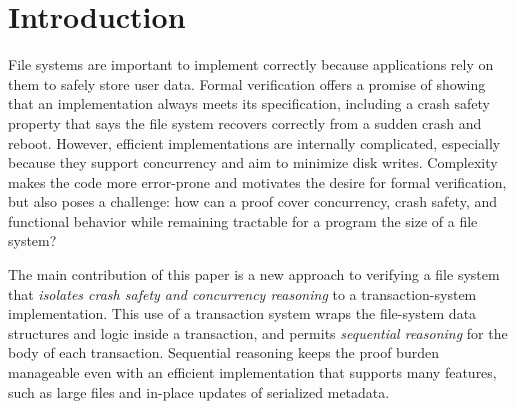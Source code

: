 \section{Introduction}


File systems are important to implement correctly because applications rely on
them to safely store user data. Formal verification offers a promise of showing
that an implementation always meets its specification, including a crash safety
property that says the file system recovers correctly from a sudden crash and
reboot. However, efficient implementations are internally complicated,
especially because they support concurrency and aim to minimize disk
writes.
Complexity makes the code more error-prone and motivates the desire for
formal verification, but also poses a challenge: how can a proof cover
concurrency, crash safety, and functional behavior while remaining tractable for
a program the size of a file system?


The main contribution of this paper is a new approach to verifying a file system that
\emph{isolates crash safety and concurrency reasoning} to a
transaction-system implementation. This use of a transaction system wraps the
file-system data structures and logic inside a transaction, and permits
\emph{sequential reasoning} for the body of each
transaction. Sequential reasoning keeps the proof burden manageable even
with an efficient implementation that supports many features, such as
large files and in-place updates of serialized metadata.

